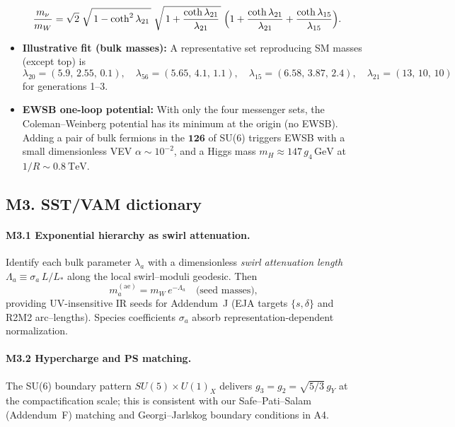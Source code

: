 \documentclass[11pt]{article}
\begin{document}
\begin{itemize}
\begin{align}
          \frac{m_\nu}{m_W}
          &= \sqrt{2}\;\sqrt{\,1-\coth^2\lambda_{21}\,}\;
          \sqrt{\,1+\frac{\coth\lambda_{21}}{\lambda_{21}}\,}\;
          \Bigl(1+\frac{\coth\lambda_{21}}{\lambda_{21}}+\frac{\coth\lambda_{15}}{\lambda_{15}}\Bigr).
          \end{align}
          \item \textbf{Illustrative fit (bulk masses):} A representative set reproducing SM masses (except top) is
          \[
              \lambda_{20}=(5.9,\,2.55,\,0.1),\quad
              \lambda_{56}=(5.65,\,4.1,\,1.1),\quad
              \lambda_{15}=(6.58,\,3.87,\,2.4),\quad
              \lambda_{21}=(13,\,10,\,10)
          \]
          for generations 1–3.
          \item \textbf{EWSB one-loop potential:} With only the four messenger sets, the Coleman–Weinberg potential has its minimum at the origin (no EWSB). Adding a pair of bulk fermions in the $\mathbf{126}$ of SU(6) triggers EWSB with a small dimensionless VEV $\alpha\sim 10^{-2}$, and a Higgs mass
          $m_H \approx 147\,g_4\,\mathrm{GeV}$ at $1/R\sim 0.8~\mathrm{TeV}$.
          \end{itemize}

      \subsection*{M3. SST/VAM dictionary}

          \paragraph{M3.1 Exponential hierarchy as swirl attenuation.}
              Identify each bulk parameter $\lambda_a$ with a dimensionless \emph{swirl attenuation length}
              $\Lambda_a\equiv \sigma_a\,L/L_*$ along the local swirl–moduli geodesic. Then
              \[
                  m_a^{(\text{ae})}=m_W\,e^{-\Lambda_a}\quad\text{(seed masses)},
              \]
              providing UV-insensitive IR seeds for Addendum~J (EJA targets $\{s,\delta\}$ and R2M2 arc–lengths). Species coefficients $\sigma_a$ absorb representation-dependent normalization.

          \paragraph{M3.2 Hypercharge and PS matching.}
              The SU(6) boundary pattern $SU(5)\times U(1)_X$ delivers $g_3{=}g_2{=}\sqrt{5/3}\,g_Y$ at the compactification scale; this is consistent with our Safe–Pati–Salam (Addendum~F) matching and Georgi–Jarlskog boundary conditions in A4.
\end{document}
